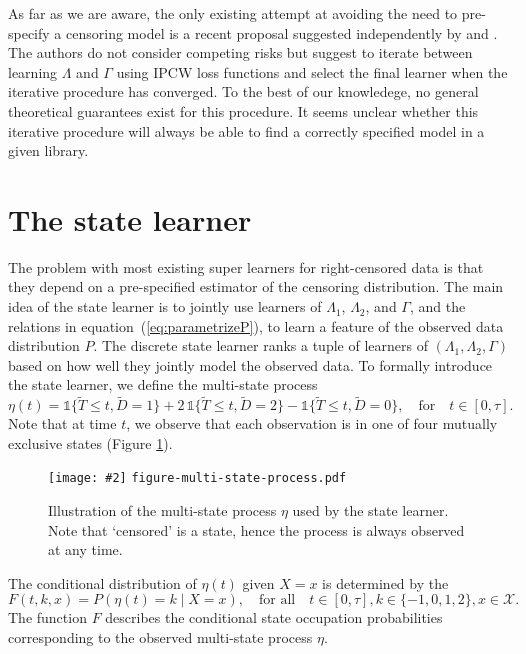 \documentclass{statsoc}
\newcommand{\includeFigCond}[2][]{
  \ifx\nofig\undefined %
    \texttt{[image: \#2]} %
  \else %
    \texttt{#2} %
  \fi %
}
\newcommand{\1}{\mathds{1}}
\begin{document}
As far as we are aware, the only existing attempt at avoiding the need to
pre-specify a censoring model is a recent proposal suggested independently by
\cite{han2021inverse} and \cite{westling2021inference}. The authors do not
consider competing risks but suggest to iterate between learning \( \Lambda \)
and $\Gamma$ using IPCW loss functions and select the final learner when the
iterative procedure has converged. To the best of our knowledege, no general
theoretical guarantees exist for this procedure. It seems unclear whether this
iterative procedure will always be able to find a correctly specified model in a
given library.


\section{The state learner}
\label{sec:super-learner-simple}

The problem with most existing super learners for right-censored data is that
they depend on a pre-specified estimator of the censoring distribution. The main
idea of the state learner is to jointly use learners of \( \Lambda_1 \),
\( \Lambda_2 \), and \( \Gamma \), and the relations in
equation~(\ref{eq:parametrizeP}), to learn a feature of the observed data
distribution \( P \). The discrete state learner ranks a tuple of learners of
\( (\Lambda_1, \Lambda_2, \Gamma) \) based on how well they jointly model the
observed data. To formally introduce the state learner, we define the
multi-state process
\begin{equation*}
  \eta(t) = \1\{\tilde{T} \leq t, \tilde D=1\} + 2\,\1\{\tilde{T} \leq t, \tilde
  D=2\} - \1\{\tilde{T} \leq t, \tilde D=0\},
  \quad \text{for} \quad t \in [0, \tau].
\end{equation*}
Note that at time \(t\), we observe that each observation is in one of four
mutually exclusive states (Figure \ref{fig:multi-state-process}).
\begin{figure}[h]
  \centering %
  \includeFigCond[width=.5\textwidth]{figure-multi-state-process.pdf}
  \caption{Illustration of the multi-state process \(\eta\) used by
    the state learner. Note that `censored' is a state, hence the
    process is always observed at any time.}
  \label{fig:multi-state-process}
\end{figure}
The conditional distribution of \( \eta(t) \) given \( X=x \) is determined by
the 
\begin{equation}
  \label{eq:F-def}
  F(t, k, x) = P(\eta(t) = k \mid X=x),
  \quad \text{for all} \quad
  t \in [0,\tau],
  k \in \{-1,0,1,2\},
  x \in \mathcal{X}.
\end{equation}
The function \( F \) describes the conditional state occupation
probabilities corresponding to the observed multi-state process
\(\eta\).
\end{document}
